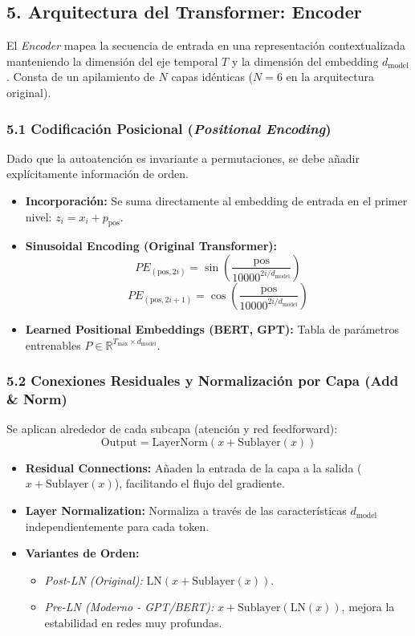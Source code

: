 \subsection{5. Arquitectura del Transformer: Encoder}

El \emph{Encoder} mapea la secuencia de entrada en una representación contextualizada manteniendo la dimensión del eje temporal $T$ y la dimensión del embedding $d_{\text{model}}$. Consta de un apilamiento de $N$ capas idénticas ($N=6$ en la arquitectura original).

\subsubsection{5.1 Codificación Posicional (\emph{Positional Encoding})}

Dado que la autoatención es invariante a permutaciones, se debe añadir explícitamente información de orden.
\begin{itemize}
	\item \textbf{Incorporación:} Se suma directamente al embedding de entrada en el primer nivel: $z_i = x_i + p_{\text{pos}}$.
	\item \textbf{Sinusoidal Encoding (Original Transformer):}
	$$PE_{(\text{pos}, 2i)} = \sin\left(\frac{\text{pos}}{10000^{2i / d_{\text{model}}}}\right)$$
	$$PE_{(\text{pos}, 2i+1)} = \cos\left(\frac{\text{pos}}{10000^{2i / d_{\text{model}}}}\right)$$
	\item \textbf{Learned Positional Embeddings (BERT, GPT):} Tabla de parámetros entrenables $P \in \mathbb{R}^{T_{\text{max}} \times d_{\text{model}}}$.
\end{itemize}

\subsubsection{5.2 Conexiones Residuales y Normalización por Capa (Add \& Norm)}

Se aplican alrededor de cada subcapa (atención y red feedforward):
$$\text{Output} = \text{LayerNorm}(x + \text{Sublayer}(x))$$

\begin{itemize}
	\item \textbf{Residual Connections:} Añaden la entrada de la capa a la salida ($x + \text{Sublayer}(x)$), facilitando el flujo del gradiente.
	\item \textbf{Layer Normalization:} Normaliza a través de las características $d_{\text{model}}$ independientemente para cada token.
	\item \textbf{Variantes de Orden:} 
	\begin{itemize}
		\item \emph{Post-LN (Original):} $\text{LN}(x + \text{Sublayer}(x))$.
		\item \emph{Pre-LN (Moderno - GPT/BERT):} $x + \text{Sublayer}(\text{LN}(x))$, mejora la estabilidad en redes muy profundas.
	\end{itemize}
\end{itemize}

